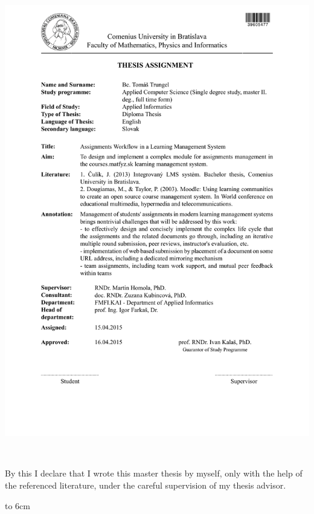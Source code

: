 \documentclass[12pt, oneside]{book}
\begin{document}
\newpage 
\thispagestyle{empty}
\hspace{-2cm}\includegraphics[width=1.1\textwidth]{Tomas_EN.pdf}


\newpage

\noindent
\begin{minipage}{0.25\textwidth}~\end{minipage}
\begin{minipage}{0.68\textwidth}
By this I declare that I wrote this master thesis by myself, only with the help of the referenced literature, under the careful supervision of my thesis advisor.
\bigskip\bigskip

\hfill\hbox to 6cm{\dotfill}
\end{minipage}
\vfill\eject %
~\vfill\eject %


\end{document}

